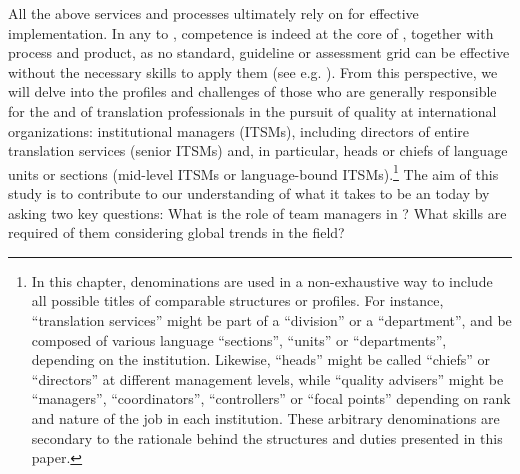 \documentclass[output=paper]{langsci/langscibook}
\begin{document}
All the above services and processes ultimately rely on  for effective implementation. In any  to , competence is indeed at the core of , together with process and product, as no standard, guideline or assessment grid can be effective without the necessary skills to apply them (see e.g. \citealt[20]{PrietoRamos2015}). From this perspective, we will delve into the profiles and challenges of those who are generally responsible for the  and  of translation professionals in the pursuit of quality at international organizations: institutional  managers (ITSMs), including directors of entire translation services (senior ITSMs) and, in particular, heads or chiefs of language units or sections (mid-level ITSMs or language-bound ITSMs).\footnote{In this chapter, denominations are used in a non-exhaustive way to include all possible titles of comparable structures or profiles. For instance, “translation services” might be part of a “division” or a “department”, and be composed of various language “sections”, “units” or “departments”, depending on the institution. Likewise, “heads” might be called “chiefs” or “directors” at different management levels, while “quality advisers” might be “managers”, “coordinators”, “controllers” or “focal points” depending on rank and nature of the job in each institution. These arbitrary denominations are secondary to the rationale behind the structures and duties presented in this paper.} The aim of this study is to contribute to our understanding of what it takes to be an  today by asking two key questions: What is the role of  team managers in ? What skills are required of them considering global trends in the field? 
\end{document}
